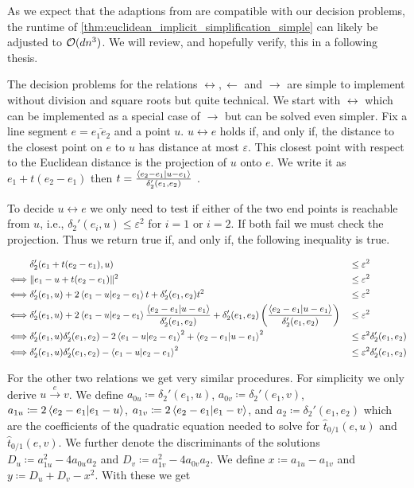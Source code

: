 As we expect that the adaptions from \citeauthor{polyline_simplification_has_cubic_complexity_bringmannetal} are compatible with our decision problems, the runtime of \cref{thm:euclidean_implicit_simplification_simple} can likely be adjusted to \(\mathcal{O}(d n^3)\). We will review, and hopefully verify, this in a following thesis. 

The decision problems for the relations \(\leftrightarrow, \leftarrow\) and \(\rightarrow\) are simple to implement without division and square roots but quite technical. We start with \(\leftrightarrow\) which can be implemented as a special case of \(\rightarrow\) but can be solved even simpler. Fix a line segment \(e = \overline{e_1e_2}\) and a point \(u\). \(u \leftrightarrow e\) holds if, and only if, the distance to the closest point on \(e\) to \(u\) has distance at most \(\varepsilon\). This closest point with respect to the Euclidean distance is the projection of \(u\) onto \(e\). We write it as \(e_1 + t(e_2 - e_1)\) then \(t = \frac{\braket{e_2 - e_1 | u - e_1}}{\delta_2'(e_1, e_2)}\) \cite{linear_algebra}. 

To decide \(u \leftrightarrow e\) we only need to test if either of the two end points is reachable from \(u\), i.e., \(\delta_2'(e_i, u) \leq \varepsilon^2\) for \(i = 1\) or \(i = 2\). If both fail we must check the projection. Thus we return true if, and only if, the following inequality is true. 

\begin{alignat*}{3}
&\delta_2'(e_1 + t(e_2 - e_1), u) &&\leq \varepsilon^2 \\
  \iff& \|e_1 - u + t(e_2 - e_1)\|^2 &&\leq \varepsilon^2 \\
  \iff& \delta_2'(e_1, u) + 2\braket{e_1 - u | e_2 - e_1}t + \delta_2'(e_1, e_2)t^2 &&\leq \varepsilon^2 \\
  \iff& \delta_2'(e_1, u) + 2\braket{e_1 - u | e_2 - e_1}\frac{\braket{e_2 - e_1 | u - e_1}}{\delta_2'(e_1, e_2)} + \delta_2'(e_1, e_2)\left(\frac{\braket{e_2 - e_1 | u - e_1}}{\delta_2'(e_1, e_2)}\right) &&\leq \varepsilon^2 \\
  \iff& \delta_2'(e_1, u)\delta_2'(e_1, e_2) - 2\braket{e_1 - u | e_2 - e_1}^2 + \braket{e_2 - e_1 | u - e_1}^2 &&\leq \varepsilon^2 \delta_2'(e_1, e_2)\\
  \iff& \delta_2'(e_1, u)\delta_2'(e_1, e_2) - \braket{e_1 - u | e_2 - e_1}^2 &&\leq \varepsilon^2 \delta_2'(e_1, e_2)
\end{alignat*}

For the other two relations we get very similar procedures. For simplicity we only derive \(u \overset e\rightarrow v\). We define \(a_{0u} \coloneq \delta_2'(e_1, u)\), \(a_{0v} \coloneq \delta_2'(e_1, v)\), \(a_{1u} \coloneq 2\braket{e_2 - e_1 | e_1 - u}\), \(a_{1v} \coloneq 2\braket{e_2 - e_1 | e_1 - v}\), and \(a_{2} \coloneq \delta_2'(e_1, e_2)\) which are the coefficients of the quadratic equation needed to solve for \(\hat t_{0/1}(e, u)\) and \(\hat t_{0/1}(e, v)\). We further denote the discriminants of the solutions \(D_u \coloneq a_{1u}^2 - 4a_{0u}a_2\) and \(D_v \coloneq a_{1v}^2 - 4a_{0v}a_2\). We define \(x  \coloneq a_{1u} - a_{1v}\) and \(y \coloneq D_u + D_v - x^2\). With these we get 

